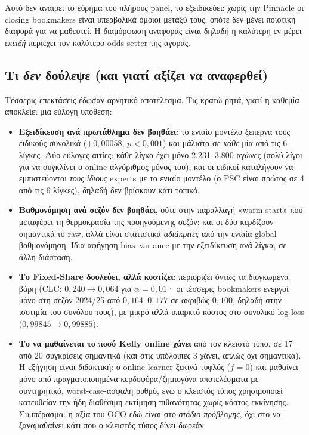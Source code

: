 \documentclass[11pt,a4paper]{article}
\renewcommand{\_}{\oldunderscore\allowbreak}
\begin{document}
Αυτό δεν αναιρεί το εύρημα του πλήρους panel, το εξειδικεύει: χωρίς την Pinnacle οι closing
bookmakers είναι υπερβολικά όμοιοι μεταξύ τους, οπότε δεν μένει ποιοτική διαφορά για να
μαθευτεί. Η διαμόρφωση αναφοράς είναι δηλαδή η καλύτερη εν μέρει \emph{επειδή} περιέχει τον
καλύτερο odds-setter της αγοράς.

\subsection{Τι \emph{δεν} δούλεψε (και γιατί αξίζει να αναφερθεί)}

Τέσσερις επεκτάσεις έδωσαν αρνητικό αποτέλεσμα. Τις κρατώ ρητά, γιατί η καθεμία αποκλείει
μια εύλογη υπόθεση:

\begin{itemize}
  \item \textbf{Εξειδίκευση ανά πρωτάθλημα δεν βοηθάει}: το ενιαίο μοντέλο ξεπερνά τους
        ειδικούς συνολικά ($+0{,}00058$, $p<0{,}001$) και μάλιστα σε \emph{κάθε} μία από τις
        6 λίγκες. Δύο εύλογες αιτίες: κάθε λίγκα έχει μόνο 2.231--3.800 αγώνες (πολύ λίγοι
        για να συγκλίνει ο online αλγόριθμος μόνος του), και οι ειδικοί καταλήγουν να
        εμπιστεύονται \emph{τους ίδιους} experts με το ενιαίο μοντέλο (ο PSC είναι πρώτος σε
        4 από τις 6 λίγκες), δηλαδή δεν βρίσκουν κάτι τοπικό.
  \item \textbf{Βαθμονόμηση ανά σεζόν δεν βοηθάει}, ούτε στην παραλλαγή «warm-start» που
        μεταφέρει τη θερμοκρασία της προηγούμενης σεζόν: και οι δύο κερδίζουν σημαντικά το
        raw, αλλά είναι στατιστικά \emph{αδιάκριτες} από την ενιαία global βαθμονόμηση. Ίδια
        αφήγηση bias--variance με την εξειδίκευση ανά λίγκα, σε άλλη διάσταση.
  \item \textbf{Το Fixed-Share δουλεύει, αλλά κοστίζει}: περιορίζει όντως τα διογκωμένα βάρη
        (CLC: $0{,}240 \to 0{,}064$ για $\alpha=0{,}01$· οι τέσσερις bookmakers ενεργοί μόνο
        στη σεζόν 2024/25 από $0{,}164$--$0{,}177$ σε ακριβώς $0{,}100$, δηλαδή στην
        ισοτιμία του συνόλου τους), με μικρό αλλά υπαρκτό κόστος στο συνολικό log-loss
        ($0{,}99845 \to 0{,}99885$).
  \item \textbf{Το να μαθαίνεται το ποσό Kelly online χάνει} από τον κλειστό τύπο, σε 17 από
        20 συγκρίσεις σημαντικά (και στις υπόλοιπες 3 χάνει, απλώς όχι σημαντικά). Η εξήγηση
        είναι διδακτική: ο online learner ξεκινά τυφλός ($f=0$) και μαθαίνει μόνο από
        πραγματοποιημένα κερδοφόρα/ζημιογόνα αποτελέσματα με συντηρητικό, worst-case-ασφαλή
        ρυθμό, ενώ ο κλειστός τύπος χρησιμοποιεί κατευθείαν την ήδη διαθέσιμη εκτίμηση
        πιθανότητας χωρίς κόστος εκκίνησης. Συμπέρασμα: η αξία του OCO εδώ είναι στο
        \emph{στάδιο πρόβλεψης}, όχι στο να ξαναμαθαίνει κάτι που ο κλειστός τύπος δίνει
        δωρεάν.
\end{itemize}
\end{document}
